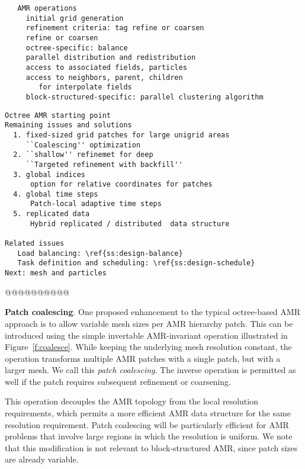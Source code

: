 \documentclass[10pt]{article}
\begin{document}
\begin{verbatim}
   AMR operations
     initial grid generation
     refinement criteria: tag refine or coarsen
     refine or coarsen
     octree-specific: balance
     parallel distribution and redistribution
     access to associated fields, particles
     access to neighbors, parent, children
        for interpolate fields
     block-structured-specific: parallel clustering algorithm
\end{verbatim}

\begin{verbatim}
Octree AMR starting point
Remaining issues and solutions
  1. fixed-sized grid patches for large unigrid areas
     ``Coalescing'' optimization
  2. ``shallow'' refinemet for deep
     ``Targeted refinement with backfill''
  3. global indices
      option for relative coordinates for patches   
  4. global time steps
      Patch-local adaptive time steps
  5. replicated data
      Hybrid replicated / distributed  data structure

Related issues
   Load balancing: \ref{ss:design-balance}
   Task definition and scheduling: \ref{ss:design-schedule}
Next: mesh and particles
\end{verbatim}

@@@@@@@@@@

\textbf{Patch coalescing}. One proposed enhancement to the typical
octree-based AMR approach is to allow variable mesh sizes per AMR
hierarchy patch.  This can be introduced using the simple invertable
AMR-invariant operation illustrated in Figure~\ref{f:coalesce}.  While
keeping the underlying mesh resolution constant, the operation
transforms multiple AMR patches with a single patch, but with a larger
mesh.  We call this \textit{patch coalescing}.  The inverse operation
is permitted as well if the patch requires subsequent refinement or
coarsening.



This operation decouples the AMR topology from the local resolution
requirements, which permits a more efficient AMR data structure for
the same resolution requirement.  Patch coalescing will be
particularly efficient for AMR problems that involve large regions
in which the resolution is uniform.  We note that this modification
is not relevant to block-structured AMR, since patch sizes are already
variable.
\end{document}
